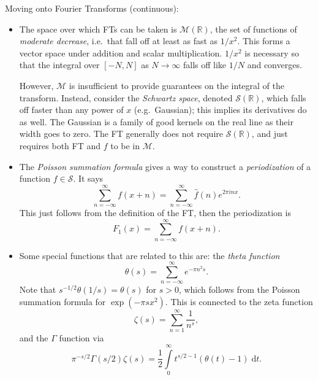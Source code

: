 \documentclass[11pt,
        usenames, %
        dvipsnames %
    ]{report}
\newcommand*{\p}[1]{\left(#1\right)}
\newcommand*{\s}[1]{\left[#1\right]}
\begin{document}
Moving onto Fourier Transforms (continuous):
\begin{itemize}
    \item The space over which FTs can be taken is $\mathcal{M}(\mathbb{R})$,
        the set of functions of \emph{moderate decrease}, i.e.\ that fall off
        at least as fast as $1/x^2$. This forms a vector space under addition
        and scalar multiplication. $1/x^2$ is necessary so that the integral
        over $\s{-N, N}$ as $N \to \infty$ falls off like $1/N$ and converges.

        However, $\mathcal{M}$ is insufficient to provide guarantees on the
        integral of the transform. Instead, consider the \emph{Schwartz space},
        denoted $\mathcal{S}(\mathbb{R})$, which falls off faster than any
        power of $x$ (e.g.\ Gaussian); this implies its derivatives do as well.
        The Gaussian is a family of good kernels on the real line as their width
        goes to zero. The FT generally does not require
        $\mathcal{S}(\mathbb{R})$, and just requires both FT and $f$ to be in
        $\mathcal{M}$.

    \item The \emph{Poisson summation formula} gives a way to construct a
        \emph{periodization} of a function $f \in \mathcal{S}$. It says
        \begin{equation}
            \sum\limits_{n = -\infty}^\infty f(x + n)
                = \sum\limits_{n = -\infty}^\infty \hat{f}(n) e^{2\pi inx}.
        \end{equation}
        This just follows from the definition of the FT, then the periodization
        is
        \begin{equation}
            F_1(x) = \sum\limits_{n = -\infty}^\infty f(x + n).
        \end{equation}

    \item Some special functions that are related to this are: the \emph{theta
        function}
        \begin{equation}
            \theta(s) = \sum\limits_{n = -\infty}^\infty e^{-\pi n^2s}.
        \end{equation}
        Note that $s^{-1/2}\theta(1/s) = \theta(s)$ for $s > 0$, which follows
        from the Poisson summation formula for $\exp(-\pi sx^2)$. This is
        connected to the zeta function
        \begin{equation}
            \zeta(s) = \sum\limits_{n=1}^\infty \frac{1}{n^s},
        \end{equation}
        and the $\Gamma$ function via
        \begin{equation}
            \pi^{-s/2}\Gamma\p{s/2}\zeta(s)
                = \frac{1}{2}\int\limits_{0}^\infty t^{s/2 - 1}
                    \p{\theta(t) - 1}\;\mathrm{d}t.
        \end{equation}


\end{itemize}
\end{document}
